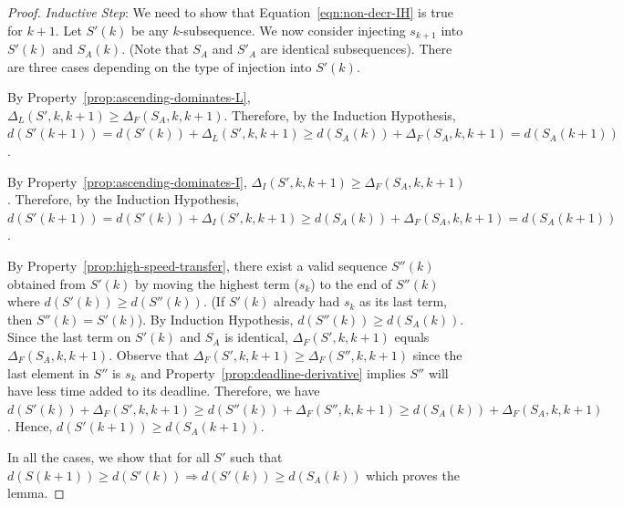 \begin{proof}
\noindent \emph{Inductive Step}:  We need to show that Equation~\ref{eqn:non-decr-IH} is true for $k+1$.  Let $S'(k)$ be any $k$-subsequence.  We now consider injecting $s_{k+1}$ into $S'(k)$ and $S_A(k)$.  (Note that $S_A$ and $S'_A$ are identical subsequences).  There are three cases depending on the type of injection into $S'(k)$.
\begin{case}
  By Property~\ref{prop:ascending-dominates-L}, $\Delta_L(S',k,k+1) \geq \Delta_F(S_A,k,k+1)$.  Therefore, by the Induction Hypothesis, $d(S'(k+1)) = d(S'(k))+ \Delta_L(S',k,k+1)\geq d(S_A(k)) + \Delta_F(S_A,k, k+1) = d(S_A(k+1))$.  
\end{case}
\begin{case}
  By Property~\ref{prop:ascending-dominates-I}, $\Delta_I(S',k,k+1) \geq \Delta_F(S_A,k,k+1)$.  Therefore, by the Induction Hypothesis, $d(S'(k+1)) = d(S'(k))+ \Delta_I(S',k,k+1)\geq d(S_A(k)) + \Delta_F(S_A,k, k+1) = d(S_A(k+1))$.  
\end{case}
\begin{case}
  By Property~\ref{prop:high-speed-transfer}, there exist a valid sequence $S''(k)$ obtained from $S'(k)$ by moving the highest term ($s_k$) to the end of $S''(k)$ where $d(S'(k))\geq d(S''(k))$.   (If $S'(k)$ already had $s_k$ as its last term, then $S''(k) = S'(k)$).  By Induction Hypothesis, $d(S''(k)) \geq d(S_A(k))$.
  Since the last term on $S'(k)$ and $S_A$ is identical, $\Delta_F(S',k, k+1)$ equals $\Delta_F(S_A,k,k+1)$.  Observe that $\Delta_F(S',k, k+1) \geq \Delta_F(S'', k, k+1)$ since the last element in $S''$ is $s_k$ and Property~\ref{prop:deadline-derivative} implies $S''$ will have less time added to its deadline.  Therefore, we have $d(S'(k))+\Delta_F(S',k,k+1) \geq d(S''(k)) + \Delta_F(S'',k,k+1) \geq d(S_A(k)) + \Delta_F(S_A,k,k+1)$. Hence, $d(S'(k+1))\geq d(S_A(k+1))$.
\end{case}
In all the cases, we show that for all $S'$ such that $d(S(k+1)) \geq d(S'(k)) \Rightarrow d(S'(k)) \geq d(S_A(k))$ which proves the lemma.
\end{proof}






